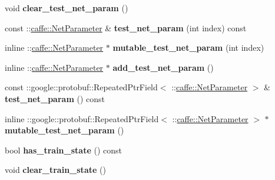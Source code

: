 \begin{DoxyCompactItemize}
void {\bfseries clear\+\_\+test\+\_\+net\+\_\+param} ()
\item 
\mbox{\label{classcaffe_1_1_solver_parameter_a8b9e4b4554b9a9d2d1e82a131b42d762}} 
const \+::\mbox{\hyperlink{classcaffe_1_1_net_parameter}{caffe\+::\+Net\+Parameter}} \& {\bfseries test\+\_\+net\+\_\+param} (int index) const
\item 
\mbox{\label{classcaffe_1_1_solver_parameter_a1ac370e706779a87bde0c92cda7d68f1}} 
inline \+::\mbox{\hyperlink{classcaffe_1_1_net_parameter}{caffe\+::\+Net\+Parameter}} $\ast$ {\bfseries mutable\+\_\+test\+\_\+net\+\_\+param} (int index)
\item 
\mbox{\label{classcaffe_1_1_solver_parameter_a76f001cc5b14bfd782bab881c4a308de}} 
inline \+::\mbox{\hyperlink{classcaffe_1_1_net_parameter}{caffe\+::\+Net\+Parameter}} $\ast$ {\bfseries add\+\_\+test\+\_\+net\+\_\+param} ()
\item 
\mbox{\label{classcaffe_1_1_solver_parameter_a3bdfab5c240dfe166513bf4cbbbcd9cb}} 
const \+::google\+::protobuf\+::\+Repeated\+Ptr\+Field$<$ \+::\mbox{\hyperlink{classcaffe_1_1_net_parameter}{caffe\+::\+Net\+Parameter}} $>$ \& {\bfseries test\+\_\+net\+\_\+param} () const
\item 
\mbox{\label{classcaffe_1_1_solver_parameter_aff959e01924c22087bf4d78c4303abb0}} 
inline \+::google\+::protobuf\+::\+Repeated\+Ptr\+Field$<$ \+::\mbox{\hyperlink{classcaffe_1_1_net_parameter}{caffe\+::\+Net\+Parameter}} $>$ $\ast$ {\bfseries mutable\+\_\+test\+\_\+net\+\_\+param} ()
\item 
\mbox{\label{classcaffe_1_1_solver_parameter_ad213832d2b2f2e60886ee6d255c9fb3d}} 
bool {\bfseries has\+\_\+train\+\_\+state} () const
\item 
\mbox{\label{classcaffe_1_1_solver_parameter_af4b536b5f2b7b92ff199f9c4edfa9c5f}} 
void {\bfseries clear\+\_\+train\+\_\+state} ()
\item 
\mbox{\label{classcaffe_1_1_solver_parameter_a1c8c05e2711489127ddbe5fee1cab8a5}} 

\end{DoxyCompactItemize}
